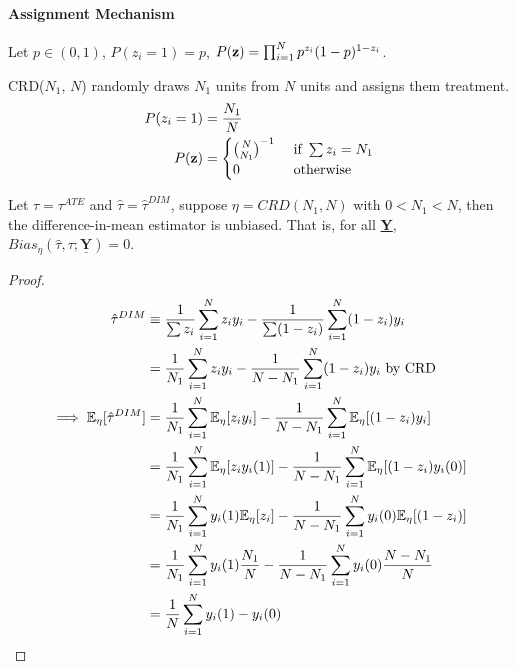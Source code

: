 \documentclass[11pt]{article}
\newcommand{\science}[0]{\underline{\textbf{Y}}}
\begin{document}
	\paragraph{Assignment Mechanism}
	\begin{example}
		Let $p \in (0, 1)$, $P(z_i = 1) = p$, $P(\textbf{z}) = \prod_{i=1}^N p^{z_i} (1-p)^{1-z_i}$.
	\end{example}
	
	\begin{example}
		CRD($N_1$, $N$) randomly draws $N_1$ units from $N$ units and assigns them treatment.
		\begin{align}
			P(z_i=1) &= \frac{N_1}{N} \\
			P(\textbf{z}) &= \begin{cases}
				{N \choose N_1}^{-1} &\text{{ if }} \sum z_i = N_1 \\
				0 &\text{{ otherwise}}
			\end{cases}
		\end{align}
	\end{example}
	
	\begin{proposition}
		Let $\tau = \tau^{ATE}$ and $\hat{\tau} = \hat{\tau}^{DIM}$, suppose $\eta = CRD(N_1, N)$ with $0 < N_1 < N$, then the difference-in-mean estimator is unbiased. That is, for all \science, $Bias_\eta(\hat{\tau}, \tau; \science) = 0$.
		\begin{proof}
			\begin{align}
				\hat{\tau}^{DIM} &\equiv \frac{1}{\sum z_i} \sum_{i=1}^N z_i y_i - \frac{1}{\sum (1-z_i)} \sum_{i=1}^N (1-z_i) y_i \\
				&= \frac{1}{N_1} \sum_{i=1}^N z_i y_i - \frac{1}{N-N_1} \sum_{i=1}^N (1-z_i) y_i \text{{ by CRD}} \\
				\implies \mathbb{E}_\eta [\hat{\tau}^{DIM}] &= \frac{1}{N_1} \sum_{i=1}^N \mathbb{E}_\eta[z_i y_i] - \frac{1}{N-N_1} \sum_{i=1}^N \mathbb{E}_\eta[(1-z_i) y_i] \\
				&= \frac{1}{N_1} \sum_{i=1}^N \mathbb{E}_\eta[z_i y_i(1)] - \frac{1}{N-N_1} \sum_{i=1}^N \mathbb{E}_\eta[(1-z_i) y_i(0)] \\
				&= \frac{1}{N_1} \sum_{i=1}^N y_i(1) \mathbb{E}_\eta[z_i] - \frac{1}{N-N_1} \sum_{i=1}^N  y_i(0) \mathbb{E}_\eta[(1-z_i)] \\
				&= \frac{1}{N_1} \sum_{i=1}^N y_i(1) \frac{N_1}{N} - \frac{1}{N-N_1} \sum_{i=1}^N  y_i(0) \frac{N-N_1}{N} \\
				&= \frac{1}{N} \sum_{i=1}^N y_i(1) - y_i(0)
			\end{align}
		\end{proof}
	\end{proposition}
	
\end{document}
